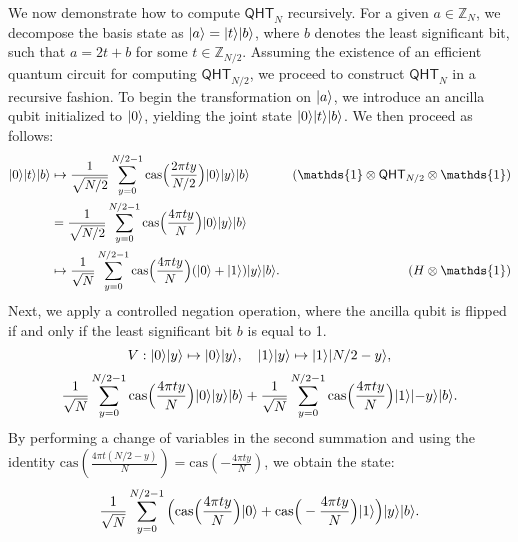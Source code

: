 \documentclass[12pt]{report}
\newcommand{\cas}{\mathrm{cas}}
\newcommand{\qht}{\mathsf{QHT}}
\begin{document}
We now demonstrate how to compute \( \qht_N \) recursively. For a given \( a \in \mathbb{Z}_N \), we decompose the basis state as \( \lvert a\rangle = \lvert t\rangle\lvert b\rangle \), where \( b \) denotes the least significant bit, such that \( a = 2t + b \) for some \( t \in \mathbb{Z}_{N/2} \). Assuming the existence of an efficient quantum circuit for computing \( \qht_{N/2} \), we proceed to construct \( \qht_N \) in a recursive fashion. To begin the transformation on \( \lvert a\rangle \), we introduce an ancilla qubit initialized to \( \lvert0\rangle \), yielding the joint state \( \lvert0\rangle\lvert t\rangle\lvert b\rangle \). We then proceed as follows:
\begin{align*}
	\ket{0}\ket{t}\ket{b}
    & \mapsto \frac{1}{\sqrt{N / 2}} \sum_{y = 0}^{N / 2 - 1} \cas\Big( \frac{2\pi t y}{N / 2} \Big) \ket{0} \ket{y} \ket{b} & (\mathds{1} \otimes \qht_{N / 2} \otimes \mathds{1}) \\
    & = \frac{1}{\sqrt{N / 2}} \sum_{y = 0}^{N / 2 - 1} \cas\Big( \frac{4\pi t y}{N} \Big) \ket{0} \ket{y} \ket{b} \\
    & \mapsto \frac{1}{\sqrt{N}} \sum_{y = 0}^{N / 2 - 1} \cas\Big( \frac{4\pi t y}{N} \Big) (\ket{0} + \ket{1}) \ket{y}\ket{b}. & (H \otimes \mathds{1})
\end{align*}
Next, we apply a controlled negation operation, where the ancilla qubit is flipped if and only if the least significant bit \( b \) is equal to 1.
\[
    V: \lvert0\rangle\lvert y\rangle \mapsto \lvert0\rangle\lvert y\rangle, \quad \lvert1\rangle\lvert y\rangle \mapsto \lvert1\rangle\lvert N / 2 -y\rangle,
\]
\[
    \frac{1}{\sqrt{N}} \sum_{y = 0}^{N / 2 - 1} \cas\Big( \frac{4\pi t y}{N} \Big) \ket{0} \ket{y} \ket{b} + \frac{1}{\sqrt{N}} \sum_{y = 0}^{N / 2 - 1} \cas\Big( \frac{4\pi t y}{N} \Big) \ket{1} \ket{-y} \ket{b}.
\]
By performing a change of variables in the second summation and using the identity \( \cas\left(\frac{4\pi t (N / 2 - y)}{N}\right) = \cas\left(-\frac{4\pi t y}{N}\right) \), we obtain the state:
\[
    \frac{1}{\sqrt{N}} \sum_{y = 0}^{N / 2 - 1} \Big( \cas\Big( \frac{4\pi t y}{N} \Big) \ket{0} + \cas\Big( -\frac{4\pi t y}{N} \Big) \ket{1} \Big) \ket{y} \ket{b}.
\]
\end{document}
